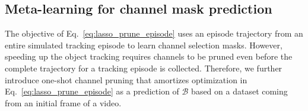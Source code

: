 \documentclass[letterpaper]{article} %
\def \dataonline{\mathcal{D}_\text{on}}
\def \dataval{\mathcal{D}_\text{test}}
\def \thetainit{{\boldsymbol{\theta}_\text{init}^0}}
\def \Ainit{\mathcal{A}_\text{init}}
\def \Aonline{\mathcal{A}_\text{on}}
\begin{document}

\subsection{Meta-learning for channel mask prediction}

The objective of Eq.~\eqref{eq:lasso_prune_episode} uses an episode trajectory from an entire simulated tracking episode to learn channel selection masks.
However, speeding up the object tracking requires channels to be pruned even before the complete trajectory for a tracking episode is collected.
Therefore, we further introduce one-shot channel pruning that amortizes optimization in Eq.~\eqref{eq:lasso_prune_episode} as a prediction of $\mathcal{B}$ based on a dataset coming from an initial frame of a video.
\end{document}
